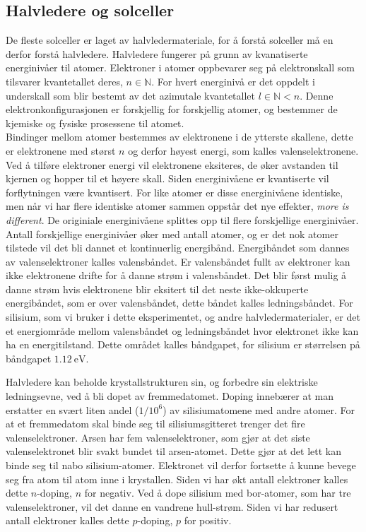 \documentclass[%
 reprint,
 amsmath,amssymb,
 aps,
 norsk,
 booktabs
]{revtex4-1}
\begin{document}
\subsection{Halvledere og solceller}
De fleste solceller er laget av halvledermateriale, for å forstå solceller må en derfor forstå halvledere. Halvledere fungerer på grunn av kvanatiserte energinivåer til atomer. Elektroner i atomer oppbevarer seg på elektronskall som tilsvarer kvantetallet deres, $n\in\mathbb{N}$. For hvert energinivå er det oppdelt i underskall som blir bestemt av det azimutale kvantetallet $l \in \mathbb{N} < n$. Denne elektronkonfigurasjonen er forskjellig for forskjellig atomer, og bestemmer de kjemiske og fysiske prosessene til atomet.\\
Bindinger mellom atomer bestemmes av elektronene i de ytterste skallene, dette er elektronene med størst $n$ og derfor høyest energi, som kalles valenselektronene. Ved å tilføre elektroner energi vil elektronene eksiteres, de øker avstanden til kjernen og hopper til et høyere skall. Siden energinivåene er kvantiserte vil forflytningen være kvantisert. For like atomer er disse energinivåene identiske, men når vi har flere identiske atomer sammen oppstår det nye effekter, \textit{more is different}. De originiale energinivåene splittes opp til flere forskjellige energinivåer. Antall forskjellige energinivåer øker med antall atomer, og er det nok atomer tilstede vil det bli dannet et kontinuerlig energibånd. Energibåndet som dannes av valenselektroner kalles valensbåndet. Er valensbåndet fullt av elektroner kan ikke elektronene drifte for å danne strøm i valensbåndet. Det blir først mulig å danne strøm hvis elektronene blir eksitert til det neste ikke-okkuperte energibåndet, som er over valensbåndet, dette båndet kalles ledningsbåndet. For silisium, som vi bruker i dette eksperimentet, og andre halvledermaterialer, er det et energiområde mellom valensbåndet og ledningsbåndet hvor elektronet ikke kan ha en energitilstand. Dette området kalles båndgapet, for silisium er størrelsen på båndgapet $\SI{1.12}{\electronvolt}$.\par
Halvledere kan beholde krystallstrukturen sin, og forbedre sin elektriske ledningsevne, ved å bli dopet av fremmedatomet. Doping innebærer at man erstatter en svært liten andel ($1/10^6$) av silisiumatomene med andre atomer. For at et fremmedatom skal binde seg til silisiumsgitteret trenger det fire valenselektroner. Arsen har fem valenselektroner, som gjør at det siste valenselektronet blir svakt bundet til arsen-atomet. Dette gjør at det lett kan binde seg til nabo silisium-atomer. Elektronet vil derfor fortsette å kunne bevege seg fra atom til atom inne i krystallen. Siden vi har økt antall elektroner kalles dette $n$-doping, $n$ for negativ. Ved å dope silisium med bor-atomer, som har tre valenselektroner, vil det danne en vandrene hull-strøm. Siden vi har redusert antall elektroner kalles dette $p$-doping, $p$ for positiv.\\
\end{document}
